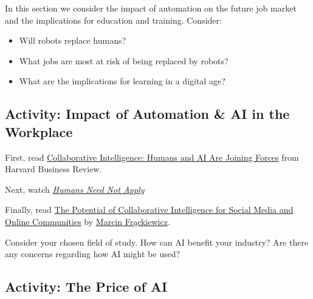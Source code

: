 \documentclass[
]{book}
\providecommand{\tightlist}{%
  \setlength{\itemsep}{0pt}\setlength{\parskip}{0pt}}
\theoremstyle{definition}
\theoremstyle{definition}
\theoremstyle{definition}
\theoremstyle{definition}
\theoremstyle{remark}
\begin{document}
In this section we consider the impact of automation on the future job market and the implications for education and training. Consider:

\begin{itemize}
\tightlist
\item
  Will robots replace humans?\\
\item
  What jobs are most at risk of being replaced by robots?\\
\item
  What are the implications for learning in a digital age?
\end{itemize}

\hypertarget{activity-impact-of-automation-ai-in-the-workplace}{%
\subsection*{Activity: Impact of Automation \& AI in the Workplace}\label{activity-impact-of-automation-ai-in-the-workplace}}

\begin{reflect}
First, read \href{https://hbr.org/2018/07/collaborative-intelligence-humans-and-ai-are-joining-forces}{Collaborative Intelligence: Humans and AI Are Joining Forces} from Harvard Business Review.

Next, watch \href{https://www.youtube.com/watch?v=7Pq-S557XQU}{\emph{Humans Need Not Apply}}

Finally, read \href{https://ts2.space/en/the-potential-of-collaborative-intelligence-for-social-media-and-online-communities/}{The Potential of Collaborative Intelligence for Social Media and Online Communities} by \href{https://ts2.space/en/author/marcin/}{Marcin Frąckiewicz}.

Consider your chosen field of study. How can AI benefit your industry? Are there any concerns regarding how AI might be used?
\end{reflect}

\hypertarget{activity-the-price-of-ai}{%
\subsection*{Activity: The Price of AI}\label{activity-the-price-of-ai}}
\end{document}

